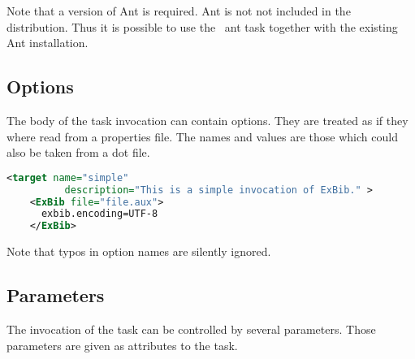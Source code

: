 Note that a version of Ant is required. Ant is not not included in the
distribution. Thus it is possible to use the \ExBib\ ant task together
with the existing Ant installation.


\subsection{Options}

The body of the task invocation can contain options. They are treated
as if they where read from a properties file. The names and values are
those which could also be taken from a dot file.

\begin{lstlisting}[language=XML,morekeywords={target}]
  <target name="simple"
          description="This is a simple invocation of ExBib." >
    <ExBib file="file.aux">
      exbib.encoding=UTF-8
    </ExBib>
\end{lstlisting}

Note that typos in option names are silently ignored.

\subsection{Parameters}

The invocation of the task can be controlled by several parameters.
Those parameters are given as attributes to the task. 

